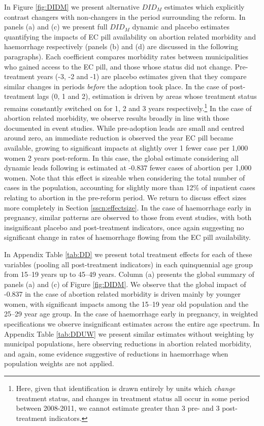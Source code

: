 \documentclass[12pt]{article}
\begin{document}
\begin{spacing}{1.9}
In Figure \ref{fig:DIDM} we present alternative $DID_M$ estimates which explicitly contrast changers with non-changers in the period surrounding the reform.  In panels (a) and (c) we present full $DID_M$ dynamic and placebo estimates quantifying the impacts of EC pill availability on abortion related morbidity and haemorrhage respectively (panels (b) and (d) are discussed in the following paragraphs).  Each coefficient compares morbidity rates between municipalities who gained access to the EC pill, and those whose status did not change.  Pre-treatment years (-3, -2 and -1) are placebo estimates given that they compare similar changes in periods \emph{before} the adoption took place.  In the case of post-treatment lags (0, 1 and 2), estimation is driven by areas whose treatment status remains constantly switched on for 1, 2 and 3 years respectively.\footnote{Here, given that identification is drawn entirely by units which \emph{change} treatment status, and changes in treatment status all occur in some period between 2008-2011, we cannot estimate greater than 3 pre- and 3 post-treatment indicators.}  In the case of abortion related morbidity, we observe results broadly in line with those documented in event studies.  While pre-adoption leads are small and centred around zero, an immediate reduction is observed the year EC pill became available, growing to significant impacts at slightly over 1 fewer case per 1,000 women 2 years post-reform.  In this case, the global estimate considering all dynamic leads following \citet{dCDHG2019} is estimated at -0.837 fewer cases of abortion per 1,000 women.  Note that this effect is sizeable when considering the total number of cases in the population, accounting for slightly more than 12\% of inpatient cases relating to abortion in the pre-reform period.  We return to discuss effect sizes more completely in Section \ref{sscn:effectsize}.  In the case of haemorrhage early in pregnancy, similar patterns are observed to those from event studies, with both insignificant placebo and post-treatment indicators, once again suggesting no significant change in rates of haemorrhage flowing from the EC pill availability.

In Appendix Table \ref{tab:DD} we present total treatment effects for each of these variables (pooling all post-treatment indicators) in each quinquennial age group from 15--19 years up to 45--49 years.  Column (a) presents the global summary of panels (a) and (c) of Figure \ref{fig:DIDM}.  We observe that the global impact of -0.837 in the case of abortion related morbidity is driven mainly by younger women, with significant impacts among the 15--19 year old population and the 25--29 year age group.  In the case of haemorrhage early in pregnancy, in weighted specifications we observe insignificant estimates across the entire age spectrum.  In Appendix Table \ref{tab:DDUW} we present similar estimates without weighting by municipal populations, here observing reductions in abortion related morbidity, and again, some evidence suggestive of reductions in haemorrhage when population weights are not applied.



\end{spacing}
\end{document}
